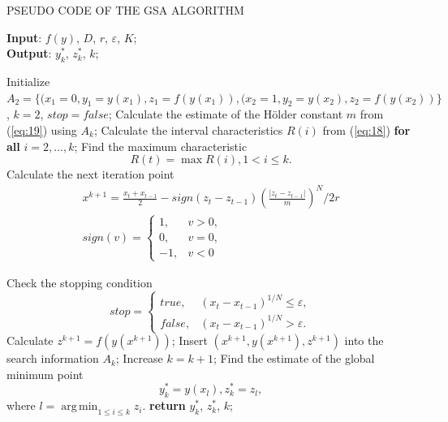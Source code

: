 \documentclass[review]{elsarticle}
\DeclareMathOperator*{\argmin}{arg\,min}
\begin{document}
\begin{algorithm}[]
\caption{PSEUDO CODE OF THE GSA ALGORITHM} \label{alg:1}
\scriptsize
\hspace*{\algorithmicindent} \textbf{Input}: $f(y)$, $D$, $r$, $\varepsilon$, $K$;\\
\hspace*{\algorithmicindent} \textbf{Output}: $y_k^*$, $z_k^*$, $k$;
\begin{algorithmic}[1]
\State Initialize $A_2=\{(x_1=0,y_1=y(x_1 ),z_1=f(y(x_1 )),(x_2=1,y_2=y(x_2 ),z_2=f(y(x_2 ))\}$, $k = 2$, $stop = false$;
  \State Calculate the estimate of the H\"older constant $m$ from (\ref{eq:19}) using $A_k$;
  \State Calculate the interval characteristics $R(i)$ from (\ref{eq:18}) \textbf{for all} $i = 2, \dots, k$;
	\State Find the maximum characteristic 
	\begin{equation}\label{eq:20}
		R(t)=\max{R(i)}, 1 < i \leq k.
  \end{equation}
	\State Calculate the next iteration point
	\begin{equation}\label{eq:21}
	\begin{matrix}
	   x^{k+1}=\frac{x_t+x_{t-1}}{2}-sign(z_t-z_{t-1})(\frac{|z_t-z_{t-1}|}{m})^N/2r \\
		 sign(v)=\begin{cases}
		            1, &v>0,\\
		            0, &v=0,\\
								-1,&v<0
							\end{cases}
	\end{matrix}
	\end{equation}
	
	\State Check the stopping condition
	\begin{equation}\label{eq:22}
     stop = \begin{cases} true, &(x_t - x_{t-1})^{1/N} \leq \varepsilon,\\
		                      false,&(x_t - x_{t-1})^{1/N} > \varepsilon.
							\end{cases}		
  \end{equation}
	  \State Calculate $z^{k+1} = f( y(x^{k+1}))$;
    \State Insert $(x^{k+1}, y(x^{k+1}), z^{k+1})$ into the search information $A_k$;
    \State Increase $k = k + 1$;
  \EndIf
\EndWhile
\State Find the estimate of the global minimum point
\begin{equation}\label{eq:23}
y_k^*= y(x_l),  z_k^*=z_l,
\end{equation}
where $l= \argmin_{1 \leq i \leq k}z_i$.
\State \textbf{return} $y_k^*$, $z_k^*$, $k$;
\end{algorithmic}
\end{algorithm}
\end{document}
